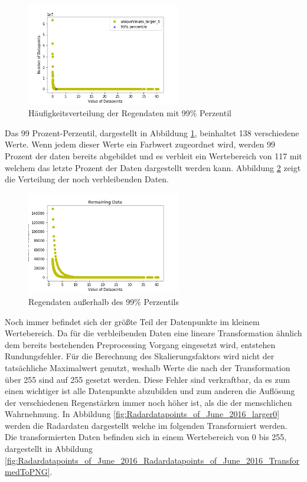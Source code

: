 \begin{figure}[H]
    \centering
    \includegraphics[width=0.6\textwidth,angle=0]{abb/Radardatapoints_of_June_2016_larger0_99percentile.png}
    \caption[Datenaufbereitung]{Häufigkeitsverteilung der Regendaten mit 99\% Perzentil}
    \label{fig:Radardatapoints_of_June_2016_larger0_99percentile}
\end{figure}

Das 99 Prozent-Perzentil, dargestellt in Abbildung \ref{fig:Radardatapoints_of_June_2016_larger0_99percentile}, beinhaltet 138 verschiedene Werte. Wenn jedem dieser Werte ein Farbwert zugeordnet wird, werden 99 Prozent der daten bereits abgebildet und es verbleit ein Wertebereich von 117 mit welchem das letzte Prozent der Daten dargestellt werden kann.
Abbildung \ref{fig:Radardatapoints_of_June_2016_RemainingData} zeigt die Verteilung der noch verbleibenden Daten.

\begin{figure}[H]
    \centering
    \includegraphics[width=0.6\textwidth,angle=0]{abb/Radardatapoints_of_June_2016_RemainingData.png}
    \caption[Datenaufbereitung]{Regendaten außerhalb des 99\% Perzentils}
    \label{fig:Radardatapoints_of_June_2016_RemainingData}
\end{figure}

Noch immer befindet sich der größte Teil der Datenpunkte im kleinem Wertebereich.
Da für die verbleibenden Daten eine lineare Transformation ähnlich dem bereits bestehenden Preprocessing Vorgang eingesetzt wird, entstehen Rundungsfehler.
Für die Berechnung des Skalierungsfaktors wird nicht der tatsächliche Maximalwert genutzt, weshalb Werte die nach der Transformation über 255 sind auf 255 gesetzt werden.
Diese Fehler sind verkraftbar, da es zum einen wichtiger ist alle Datenpunkte abzubilden und zum anderen die Auflösung der verschiedenen Regenstärken immer noch höher ist, als die der menschlichen Wahrnehmung.
In Abbildung \ref{fig:Radardatapoints_of_June_2016_larger0} werden die Radardaten dargestellt welche im folgenden Transformiert werden.
Die transformierten Daten befinden sich in einem Wertebereich von 0 bis 255, dargestellt in Abbildung \ref{fig:Radardatapoints_of_June_2016_Radardatapoints_of_June_2016_TransformedToPNG}.

